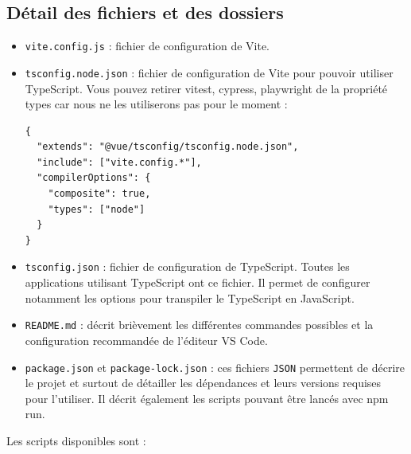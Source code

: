 \documentclass{article}
\begin{document}
\subsection{Détail des fichiers et des dossiers}
\begin{itemize}
\item {\tt vite.config.js} : fichier de configuration de Vite.
\item {\tt tsconfig.node.json} : fichier de configuration de Vite pour pouvoir utiliser TypeScript. Vous pouvez retirer vitest, cypress, playwright de la propriété types car nous ne les utiliserons pas pour le moment :


\begin{verbatim}
{
  "extends": "@vue/tsconfig/tsconfig.node.json",
  "include": ["vite.config.*"],
  "compilerOptions": {
    "composite": true,
    "types": ["node"]
  }
}
\end{verbatim} 
\item {\tt tsconfig.json} : fichier de configuration de TypeScript. Toutes les applications utilisant TypeScript ont ce fichier. Il permet de configurer notamment les options pour transpiler le TypeScript en JavaScript.
\item {\tt README.md} : décrit brièvement les différentes commandes possibles et la configuration recommandée de l'éditeur VS Code.
\item {\tt package.json} et {\tt package-lock.json} : ces fichiers {\tt JSON} permettent de décrire le projet et surtout de détailler les dépendances et leurs versions requises pour l'utiliser. Il décrit également les scripts pouvant être lancés avec {\color{monOrange}npm run}.
\end{itemize}
Les scripts disponibles sont :
\end{document}
